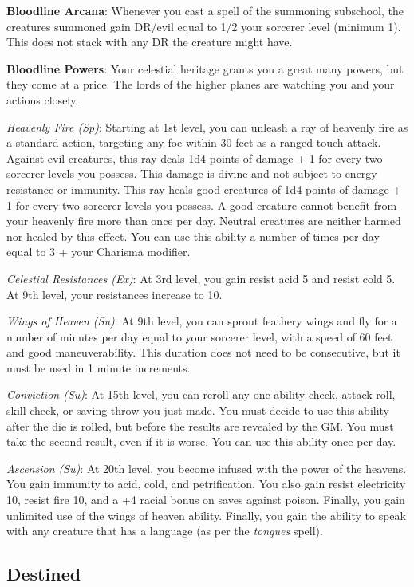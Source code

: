 \textbf{Bloodline Arcana}: Whenever you cast a spell of the summoning subschool, the creatures summoned gain DR/evil equal to 1/2 your sorcerer level (minimum 1). This does not stack with any DR the creature might have.
				
\textbf{Bloodline Powers}: Your celestial heritage grants you a great many powers, but they come at a price. The lords of the higher planes are watching you and your actions closely.
				
\textit{Heavenly Fire (Sp)}: Starting at 1st level, you can unleash a ray of heavenly fire as a standard action, targeting any foe within 30 feet as a ranged touch attack. Against evil creatures, this ray deals 1d4 points of damage + 1 for every two sorcerer levels you possess. This damage is divine and not subject to energy resistance or immunity. This ray heals good creatures of 1d4 points of damage + 1 for every two sorcerer levels you possess. A good creature cannot benefit from your heavenly fire more than once per day. Neutral creatures are neither harmed nor healed by this effect. You can use this ability a number of times per day equal to 3 + your Charisma modifier.
				
\textit{Celestial Resistances (Ex)}: At 3rd level, you gain resist acid 5 and resist cold 5. At 9th level, your resistances increase to 10.
				
\textit{Wings of Heaven (Su)}: At 9th level, you can sprout feathery wings and fly for a number of minutes per day equal to your sorcerer level, with a speed of 60 feet and good maneuverability. This duration does not need to be consecutive, but it must be used in 1 minute increments. 
				
\textit{Conviction (Su)}: At 15th level, you can reroll any one ability check, attack roll, skill check, or saving throw you just made. You must decide to use this ability after the die is rolled, but before the results are revealed by the GM. You must take the second result, even if it is worse. You can use this ability once per day.
				
\textit{Ascension (Su)}: At 20th level, you become infused with the power of the heavens. You gain immunity to acid, cold, and petrification. You also gain resist electricity 10, resist fire 10, and a +4 racial bonus on saves against poison. Finally, you gain unlimited use of the wings of heaven ability. Finally, you gain the ability to speak with any creature that has a language (as per the \textit{tongues }spell).
				
\subsection{Destined}

